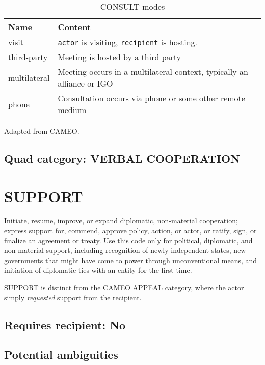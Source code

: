 \documentclass[11pt]{report}
\newcommand{\plcat}[1]{\textsf{#1}}
\newcommand{\txt}[1]{\texttt{#1}}
\begin{document}
\begin{table}[htp]
\caption{CONSULT modes}
\begin{center}
\begin{tabular}{|l|p{13cm}|}
\hline
Name & Content \\
\hline
visit & \txt{actor} is visiting, \txt{recipient} is hosting.\\
third-party & Meeting is hosted by a third party\\
multilateral & Meeting occurs in a multilateral context, typically an alliance or IGO\\
phone & Consultation occurs via phone or some other remote medium\\
\hline
\end{tabular}
\end{center}
\label{tab:consultmode}
Adapted from CAMEO.
\end{table}%

\subsection{Quad category: VERBAL COOPERATION}


\newpage

\section{SUPPORT}

Initiate, resume, improve, or expand diplomatic, non-material cooperation; express support for, commend, approve policy, action, or actor, or ratify, sign, or finalize an agreement or treaty. Use this code only for political, diplomatic, and non-material support, including recognition of newly independent states, new governments that might have come to power through unconventional means, and initiation of diplomatic ties with an entity for the first time.

\plcat{SUPPORT} is distinct from the CAMEO \plcat{APPEAL} category, where the actor simply \textit{requested} support from the recipient.

\subsection{Requires recipient: No}

\subsection{Potential ambiguities}
\end{document}
